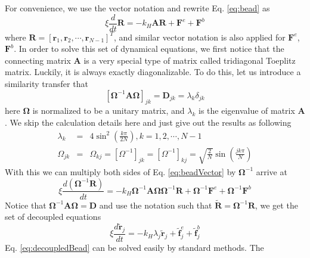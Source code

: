 \documentclass[12pt,a4paper]{article}
\begin{document}
For convenience, we use the vector notation and rewrite Eq. \eqref{eq:bead} as 
\begin{equation}
    \label{eq:beadVector}
    \xi \frac{d }{dt} \mathbf{R} = - k_H \mathbf{A} \mathbf{R} + \mathbf{F}^e + \mathbf{F}^b
\end{equation}
where $\mathbf{R} = \left[\mathbf r_1, \mathbf r_2, \cdots, \mathbf r_{N-1}\right]^T$,
and similar vector notation is also applied for $\mathbf{F}^e$, $\mathbf{F}^b$.
In order to solve this set of dynamical equations, we first notice that the
connecting matrix $\mathbf{A}$ is a very special type of matrix called
tridiagonal Toeplitz matrix\cite{}. Luckily, it is always exactly
diagonalizable. To do this, let us introduce a similarity transfer that
\begin{equation}
    \label{eq:similarityTransfer}
    \left[\mathbf{\Omega}^{-1} \mathbf{A} \mathbf{\Omega}\right]_{jk} =
    \mathbf{D}_{jk} = \lambda_k\delta_{jk}
\end{equation}
here $\mathbf{\Omega}$ is normalized to be a unitary matrix, and $\lambda_k$ is the
eigenvalue of matrix $\mathbf A$. We skip the calculation details here and just give
out the results as following
\begin{eqnarray}
    \lambda_k  & = & 4\sin^2\left(\frac{k\pi}{2 N}\right), k = 1, 2, \cdots, N-1 \\
    \Omega_{jk} & = & \Omega_{kj} = [\Omega^{-1}]_{jk} = [\Omega^{-1}]_{kj} =
    \sqrt{\frac{2}{N}}\sin\left(\frac{jk\pi}{N}\right)
\end{eqnarray}
With this we can multiply both sides of Eq. \eqref{eq:beadVector} by
$\mathbf{\Omega}^{-1}$ arrive at
\begin{equation}
    \label{eq:badVectorTransfer}
    \xi\frac{d(\mathbf{\Omega}^{-1}\mathbf{R})}{dt} = -k_{H}\mathbf{\Omega}^{-1}
    \mathbf{A}\mathbf{\Omega}\mathbf{\Omega}^{-1}\mathbf{R} +
    \mathbf{\Omega}^{-1}\mathbf{F}^e + \mathbf{\Omega}^{-1}\mathbf{F}^b
\end{equation}
Notice that $\mathbf{\Omega}^{-1}\mathbf{A}\mathbf{\Omega} = \mathbf{D}$ and
use the notation such that $\tilde{\mathbf{R}} = \mathbf{\Omega}^{-1}
\mathbf{R}$, we get the set of decoupled equations
\begin{equation}
    \label{eq:decoupledBead}
    \xi\frac{d\tilde{\mathbf{r}}_j}{dt} = -k_{H} \lambda_j \tilde{\mathbf{r}}_j
    + \tilde{\mathbf{f}}^e_j + \tilde{\mathbf{f}}^b_j
\end{equation}
Eq. \eqref{eq:decoupledBead} can be solved easily by standard methods. The
\end{document}
